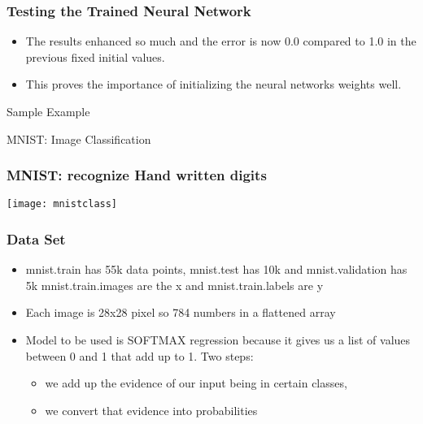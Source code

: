 \begin{frame}[fragile] \frametitle{Testing the Trained Neural Network}

\begin{itemize}
\item The results enhanced so much and the error is now 0.0 compared to 1.0 in the previous fixed initial values. 
\item This proves the importance of initializing the neural networks weights well.
\end{itemize}

\end{frame}












\begin{frame}
  \begin{center}
    {\Large Sample Example}
    
    MNIST: Image Classification
  \end{center}
\end{frame}


\begin{frame}[fragile] \frametitle{MNIST: recognize Hand written digits}
\begin{center}
\texttt{[image: mnistclass]}
\end{center}
\end{frame}

\begin{frame}[fragile] \frametitle{Data Set}

\begin{itemize}
\item mnist.train has 55k data points, mnist.test has 10k and mnist.validation has 5k mnist.train.images are the x and mnist.train.labels are y
\item Each image is 28x28 pixel so 784 numbers in a flattened array
\item Model to be used is SOFTMAX regression because it gives us a list of values between 0 and 1 that add up to 1. Two steps: 
\begin{itemize}
\item we add up the evidence of our input being in certain classes, 
\item we convert that evidence into probabilities
\end{itemize}
\end{itemize}

\end{frame}

